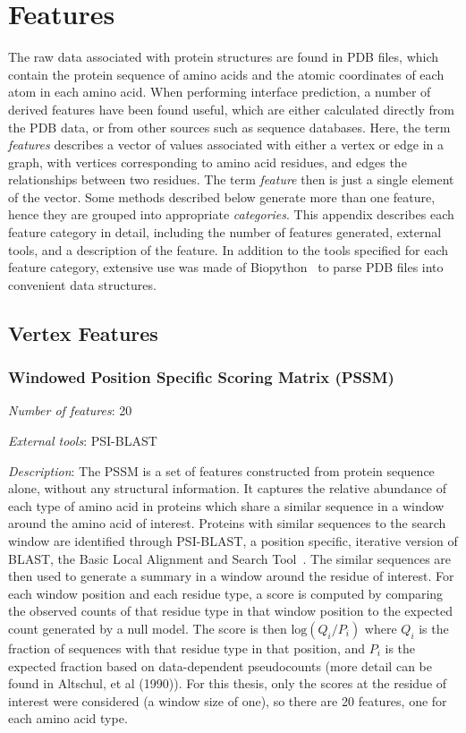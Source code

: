 \chapter{Features}
\label{appendix:features}

The raw data associated with protein structures are found in PDB files, which contain the protein sequence of amino acids and the atomic coordinates of each atom in each amino acid.
When performing interface prediction, a number of derived features have been found useful, which are either calculated directly from the PDB data, or from other sources such as sequence databases.
Here, the term \emph{features} describes a vector of values associated with either a vertex or edge in a graph, with vertices corresponding to amino acid residues, and edges the relationships between two residues.
The term \emph{feature} then is just a single element of the vector.
Some methods described below generate more than one feature, hence they are grouped into appropriate \emph{categories}.
This appendix describes each feature category in detail, including the number of features generated, external tools, and a description of the feature.
In addition to the tools specified for each feature category, extensive use was made of Biopython~\cite{cock2009} to parse PDB files into convenient data structures. 

\section{Vertex Features}

\subsection{Windowed Position Specific Scoring Matrix (PSSM)}
\noindent
\emph{Number of features}: 20

\noindent
\emph{External tools}: PSI-BLAST~\cite{altschul1997}

\noindent
\emph{Description}:
The PSSM is a set of features constructed from protein sequence alone, without any structural information.
It captures the relative abundance of each type of amino acid in proteins which share a similar sequence in a window around the amino acid of interest.
Proteins with similar sequences to the search window are identified through PSI-BLAST, a position specific, iterative version of BLAST, the Basic Local Alignment and Search Tool~\cite{altschul1990}.
The similar sequences are then used to generate a summary in a window around the residue of interest.
For each window position and each residue type, a score is computed by comparing the observed counts of that residue type in that window position to the expected count generated by a null model.
The score is then $\text{log}(Q_i/P_i)$ where $Q_i$ is the fraction of sequences with that residue type in that position, and $P_i$ is the expected fraction based on data-dependent pseudocounts (more detail can be found in Altschul, et al (1990)).
For this thesis, only the scores at the residue of interest were considered (a window size of one), so there are 20 features, one for each amino acid type. 

